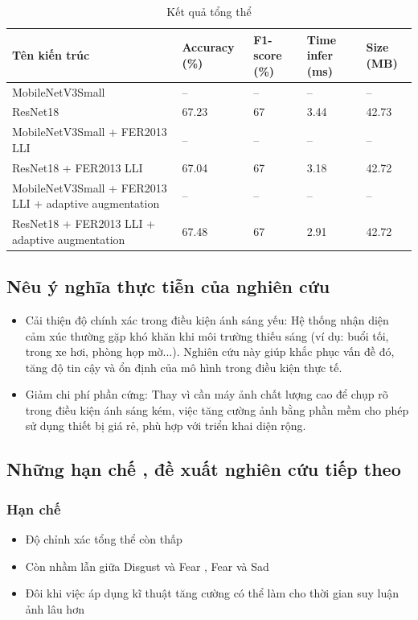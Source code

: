 \begin{table}[H]
\centering
{}  %
\begin{tabular}{|>{\raggedright\arraybackslash}p{4cm}|l|l|l|l|}
\hline
\rowcolor{gray!40} \textbf{Tên kiến trúc} & \textbf{Accuracy (\%)} & \textbf{F1-score (\%)} & \textbf{Time infer (ms)} & \textbf{Size (MB)} \\
\hline
MobileNetV3Small & -- & -- & -- & -- \\
ResNet18 & 67.23 & 67 & 3.44 & 42.73 \\
MobileNetV3Small + FER2013 LLI  & -- & -- & -- & -- \\
ResNet18 + FER2013 LLI  & 67.04 & 67 & 3.18 & 42.72 \\
MobileNetV3Small +  FER2013 LLI +  adaptive augmentation& -- & -- & -- & -- \\
ResNet18 +  FER2013 LLI +  adaptive augmentation& 67.48 & 67 & 2.91 & 42.72 \\
\hline
\end{tabular}
\caption{Kết quả tổng thể}
\end{table}

\subsection{Nêu ý nghĩa thực tiễn của nghiên cứu}
\begin{itemize}
    \item Cải thiện độ chính xác trong điều kiện ánh sáng yếu: Hệ thống nhận diện cảm xúc thường gặp khó khăn khi môi trường thiếu sáng (ví dụ: buổi tối, trong xe hơi, phòng họp mờ...). Nghiên cứu này giúp khắc phục vấn đề đó, tăng độ tin cậy và ổn định của mô hình trong điều kiện thực tế.
    \item Giảm chi phí phần cứng: Thay vì cần máy ảnh chất lượng cao để chụp rõ trong điều kiện ánh sáng kém, việc tăng cường ảnh bằng phần mềm cho phép sử dụng thiết bị giá rẻ, phù hợp với triển khai diện rộng.
\end{itemize}

\subsection{Những hạn chế , đề xuất nghiên cứu tiếp theo}

\subsubsection{Hạn chế}
\begin{itemize}
    \item Độ chỉnh xác tổng thể còn thấp
    \item Còn nhầm lẫn giữa Disgust và Fear , Fear và Sad
    \item Đôi khi việc áp dụng kĩ thuật tăng cường có thể làm cho thời gian suy luận ảnh lâu hơn
\end{itemize}

